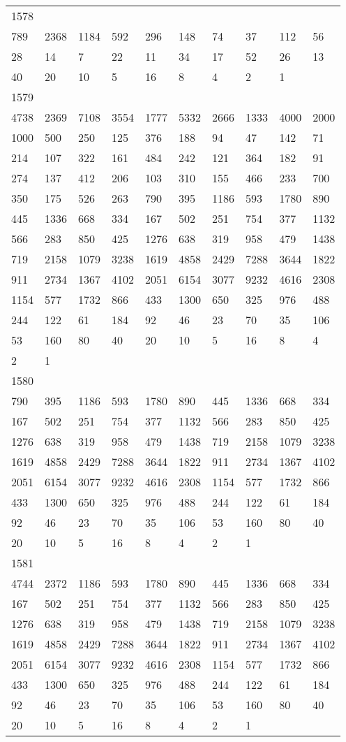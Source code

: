 \begin{longtable}{*{10}{l}}
1578&&&&&&&&&\\
789& 2368& 1184& 592& 296& 148& 74& 37& 112& 56\\
28& 14& 7& 22& 11& 34& 17& 52& 26& 13\\
40& 20& 10& 5& 16& 8& 4& 2& 1& \\

1579&&&&&&&&&\\
4738& 2369& 7108& 3554& 1777& 5332& 2666& 1333& 4000& 2000\\
1000& 500& 250& 125& 376& 188& 94& 47& 142& 71\\
214& 107& 322& 161& 484& 242& 121& 364& 182& 91\\
274& 137& 412& 206& 103& 310& 155& 466& 233& 700\\
350& 175& 526& 263& 790& 395& 1186& 593& 1780& 890\\
445& 1336& 668& 334& 167& 502& 251& 754& 377& 1132\\
566& 283& 850& 425& 1276& 638& 319& 958& 479& 1438\\
719& 2158& 1079& 3238& 1619& 4858& 2429& 7288& 3644& 1822\\
911& 2734& 1367& 4102& 2051& 6154& 3077& 9232& 4616& 2308\\
1154& 577& 1732& 866& 433& 1300& 650& 325& 976& 488\\
244& 122& 61& 184& 92& 46& 23& 70& 35& 106\\
53& 160& 80& 40& 20& 10& 5& 16& 8& 4\\
2& 1& \\

1580&&&&&&&&&\\
790& 395& 1186& 593& 1780& 890& 445& 1336& 668& 334\\
167& 502& 251& 754& 377& 1132& 566& 283& 850& 425\\
1276& 638& 319& 958& 479& 1438& 719& 2158& 1079& 3238\\
1619& 4858& 2429& 7288& 3644& 1822& 911& 2734& 1367& 4102\\
2051& 6154& 3077& 9232& 4616& 2308& 1154& 577& 1732& 866\\
433& 1300& 650& 325& 976& 488& 244& 122& 61& 184\\
92& 46& 23& 70& 35& 106& 53& 160& 80& 40\\
20& 10& 5& 16& 8& 4& 2& 1& \\

1581&&&&&&&&&\\
4744& 2372& 1186& 593& 1780& 890& 445& 1336& 668& 334\\
167& 502& 251& 754& 377& 1132& 566& 283& 850& 425\\
1276& 638& 319& 958& 479& 1438& 719& 2158& 1079& 3238\\
1619& 4858& 2429& 7288& 3644& 1822& 911& 2734& 1367& 4102\\
2051& 6154& 3077& 9232& 4616& 2308& 1154& 577& 1732& 866\\
433& 1300& 650& 325& 976& 488& 244& 122& 61& 184\\
92& 46& 23& 70& 35& 106& 53& 160& 80& 40\\
20& 10& 5& 16& 8& 4& 2& 1& \\


\end{longtable}
